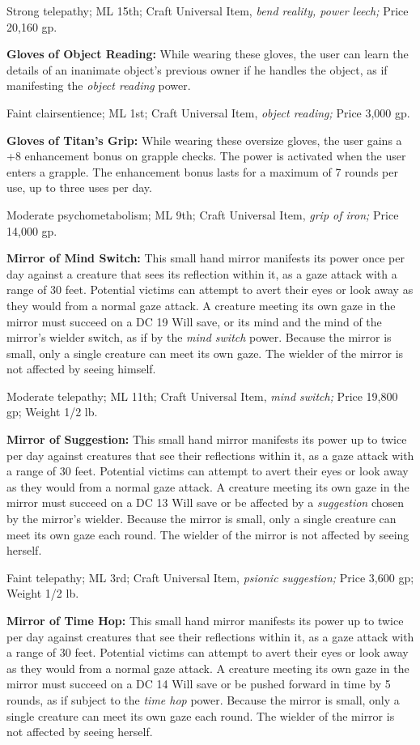 \documentclass{article}
\begin{document}
Strong telepathy; ML 15th; Craft Universal Item, \textit{bend reality, power leech; 
}Price 20,160 gp.

\textbf{Gloves of Object Reading: }While wearing these gloves, the user can learn 
the details of an inanimate object's previous owner if he handles the object, as 
if manifesting the \textit{object reading }power.

Faint clairsentience; ML 1st; Craft Universal Item, \textit{object reading; }Price 
3,000 gp.

\textbf{Gloves of Titan's Grip:} While wearing these oversize gloves, the user 
gains a +8 enhancement bonus on grapple checks. The power is activated when the 
user enters a grapple. The enhancement bonus lasts for a maximum of 7 rounds per 
use, up to three uses per day.

Moderate psychometabolism; ML 9th; Craft Universal Item, \textit{grip of iron; 
}Price 14,000 gp.

\textbf{Mirror of Mind Switch: }This small hand mirror manifests its power once 
per day against a creature that sees its reflection within it, as a gaze attack 
with a range of 30 feet. Potential victims can attempt to avert their eyes or look 
away as they would from a normal gaze attack. A creature meeting its own gaze in 
the mirror must succeed on a DC 19 Will save, or its mind and the mind of the mirror's 
wielder switch, as if by the \textit{mind switch }power. Because the mirror is 
small, only a single creature can meet its own gaze. The wielder of the mirror 
is not affected by seeing himself.

Moderate telepathy; ML 11th; Craft Universal Item, \textit{mind switch; }Price 
19,800 gp; Weight 1/2 lb.

\textbf{Mirror of Suggestion:} This small hand mirror manifests its power up to 
twice per day against creatures that see their reflections within it, as a gaze 
attack with a range of 30 feet. Potential victims can attempt to avert their eyes 
or look away as they would from a normal gaze attack. A creature meeting its own 
gaze in the mirror must succeed on a DC 13 Will save or be affected by a \textit{suggestion 
}chosen by the mirror's wielder. Because the mirror is small, only a single creature 
can meet its own gaze each round. The wielder of the mirror is not affected by 
seeing herself.

Faint telepathy; ML 3rd; Craft Universal Item, \textit{psionic suggestion; }Price 
3,600 gp; Weight 1/2 lb.

\textbf{Mirror of Time Hop: }This small hand mirror manifests its power up to twice 
per day against creatures that see their reflections within it, as a gaze attack 
with a range of 30 feet. Potential victims can attempt to avert their eyes or look 
away as they would from a normal gaze attack. A creature meeting its own gaze in 
the mirror must succeed on a DC 14 Will save or be pushed forward in time by 5 
rounds, as if subject to the \textit{time hop }power. Because the mirror is small, 
only a single creature can meet its own gaze each round. The wielder of the mirror 
is not affected by seeing herself.
\end{document}
